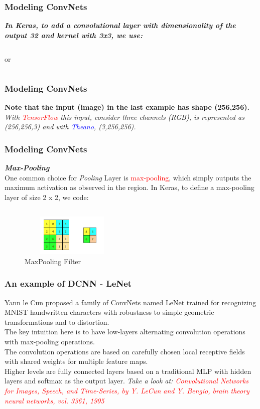 \documentclass[aspectratio=169]{beamer}
\begin{document}
\begin{frame}
\frametitle{Modeling ConvNets}
\textbf{\emph{In Keras, to add a convolutional layer with dimensionality of the output 32 and kernel with 3x3, we use:}}
\inputminted{python}{./aux_files/twentyfive.py}
or 
\inputminted{python}{./aux_files/twentysix.py}
\end{frame}

\begin{frame}
\frametitle{Modeling ConvNets}
\textbf{Note that the input (image) in the last example has shape (256,256).}
\\[0.3cm]
\emph{With \textcolor{red}{TensorFlow} this input, consider three channels (RGB), is represented as (256,256,3) and with \textcolor{blue}{Theano}, (3,256,256).}
\end{frame}

\begin{frame}
\frametitle{Modeling ConvNets}
\textbf{\emph{Max-Pooling}}
\\[0.1cm]
One  common choice for \emph{Pooling} Layer is \textcolor{red}{max-pooling}, which simply outputs the maximum activation as observed in the region. In Keras, to define a max-pooling layer of size 2 x 2, we code:
\inputminted{python}{./aux_files/twentyseven.py}
\begin{figure}
\includegraphics[width=5cm,height=2cm]{./aux_files/three.jpg}
\caption{MaxPooling Filter}
\label{fig:MaxPooling Filter- Shaped(2x2)}
\end{figure}
\end{frame}

\begin{frame}
\frametitle{An example of DCNN - LeNet}
Yann le Cun proposed  a family of ConvNets named LeNet trained for recognizing MNIST handwritten characters with robustness to simple geometric transformations and to distortion. 
\\[0.3cm]
The key intuition here is to have low-layers alternating convolution operations with max-pooling operations. 
\\[0.3cm]
The convolution operations are based on carefully chosen local receptive fields with shared weights for multiple feature maps. 
\\[0.3cm]
Higher levels are fully connected layers based on a traditional MLP with hidden layers and softmax as the output layer.
\textit{Take a look at: \textcolor{red}{Convolutional Networks for Images, Speech, and Time-Series, by Y. LeCun and Y. Bengio, brain theory neural networks, vol. 3361, 1995}}
\end{frame}
\end{document}
